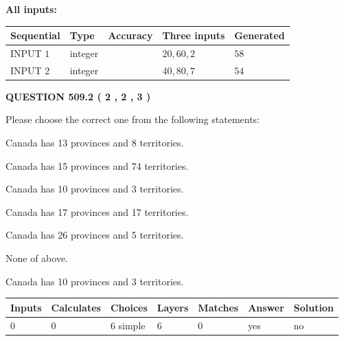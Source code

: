 \documentclass[12pt]{article}
\begin{document}
   
   
   
\noindent\vspace{0.1in}\hspace{-0.08in} {\textbf{\Large{All inputs: }}}
   
   
  
  
\noindent\begin{tabular}{|l|l|l|l|l|}
\hline
 Sequential & Type & Accuracy & Three inputs & Generated \\ 
\hline
 
 
  INPUT $  1 $ & integer &  & $
 20
 , 
 60
 , 
 2
 $ & $ 58 $ 
 \\  \hline  
 
 
  INPUT $  2 $ & integer &  & $
 40
 , 
 80
 , 
 7
 $ & $ 54 $ 
 \\  \hline  
 \end{tabular}
   
   
  
\vspace{0.2in}
  
{\textbf{\Large{QUESTION
509.2 
 ( 2 , 2 , 3 )
}}}
  
  
Please choose the correct one from the following statements:
 
 
Canada has  13 provinces and  8 territories.
 
 
Canada has  15 provinces and  74 territories.
 
 
Canada has 10  provinces and 3 territories.
 
 
Canada has  17 provinces and  17 territories.
 
 
Canada has  26 provinces and  5 territories.
 
 
 None of above.
 
 
\noindent{}
 
 
Canada has 10  provinces and 3 territories.
 
 
\noindent{}
 
 
   
   
   
   
\noindent\begin{tabular}{|l|l|l|l|l|l|l|}
 \hline
Inputs & Calculates & Choices & Layers & Matches & Answer & Solution \\ \hline
 0  & 
 0  & 
 6
  simple  
  & 
 6  & 
 0  & 
  yes & 
  no 
  \\ \hline
 \end{tabular}
   
\end{document}
